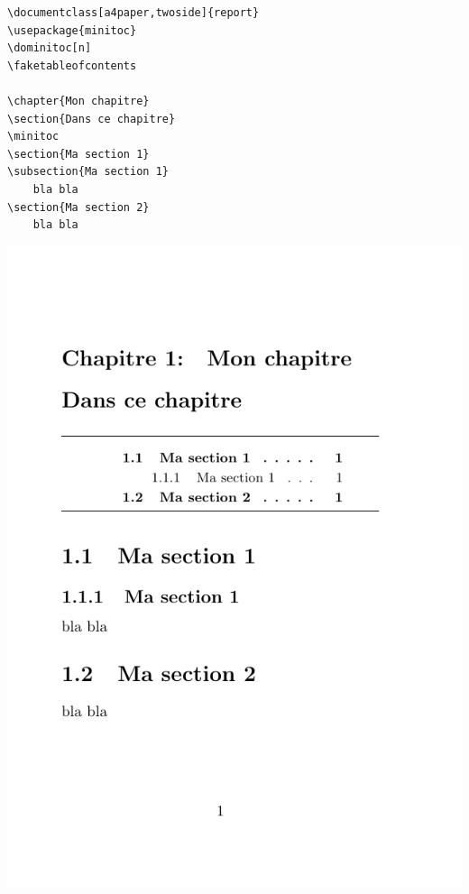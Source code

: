 \begin{minipage}{.48\linewidth}
	\begin{verbatim}
\documentclass[a4paper,twoside]{report}
\usepackage{minitoc}
\dominitoc[n]
\faketableofcontents

\chapter{Mon chapitre}
\section{Dans ce chapitre}
\minitoc
\section{Ma section 1}
\subsection{Ma section 1}
    bla bla
\section{Ma section 2}
    bla bla

	\end{verbatim}
\end{minipage}
\hfill
\begin{boxedminipage}{.4\linewidth}
	\centering
	\includegraphics[scale=.5]{images/choix_extensions_exemple_minitoc}
\end{boxedminipage}
